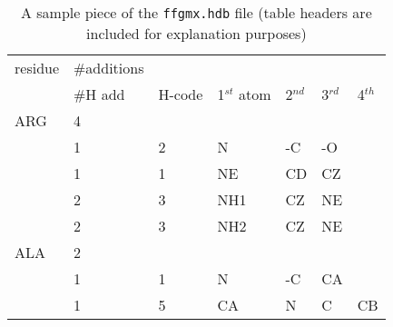 \begin{table}[h]
\caption{A sample piece of the {\tt ffgmx.hdb} file 
(table headers are included for explanation purposes)}
\label{tab:ffgmxhdb}
\centering
\begin{tabular}{lllllll}
residue & \#additions&  &       &       &  	&	\\
        & \#H add    & H-code& 1$^{st}$ atom    & 2$^{nd}$ & 3$^{rd}$ & 4$^{th}$ \\
\hline
ARG     & 4	&	&  	&	&	&	\\
        & 1	& 2     & N     & -C	& -O	&     	\\
        & 1	& 1     & NE    & CD	& CZ	&    	\\
        & 2	& 3     & NH1   & CZ	& NE	&   	\\
        & 2	& 3     & NH2   & CZ	& NE	& 	\\
ALA 	& 2	& 	&	&	&	&	\\
	& 1	& 1	& N	& -C	& CA	&	\\
	& 1	& 5	& CA	& N	& C	& CB
\end{tabular}
\end{table}

